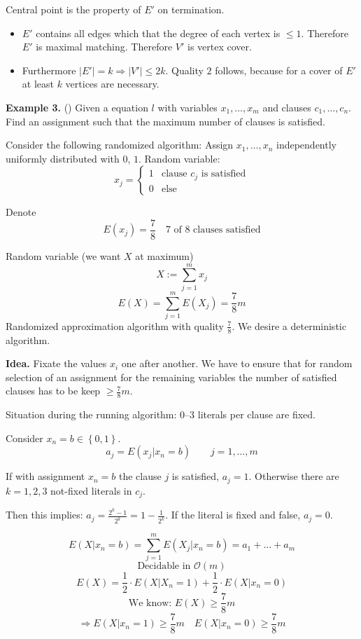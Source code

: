 \documentclass[a4paper]{article}
\newcommand{\probl}[1]{\text{\textsc{#1}}}
\newcommand{\set}[1]{\left\{#1\right\}}
\begin{document}
Central point is the property of $E'$ on termination.
\begin{itemize}
  \item
    $E'$ contains all edges which that the degree of each vertex
    is $\leq 1$. Therefore $E'$ is maximal matching.
    Therefore $V'$ is vertex cover.

  \item
    Furthermore $|E'| = k \Rightarrow |V'| \leq 2k$. Quality $2$ follows,
    because for a cover of $E'$ at least $k$ vertices are necessary.
\end{itemize}

\textbf{Example 3.} (\probl{Max-3-SAT}) Given a \probl{3~SAT} equation $l$ with variables
  $x_1, \ldots, x_m$ and clauses $c_1, \ldots, c_n$. Find an assignment such
  that the maximum number of clauses is satisfied.

Consider the following randomized algorithm:
Assign $x_1, \ldots, x_n$ independently uniformly distributed with $0$, $1$.
Random variable:
\[
  x_j = \begin{cases}
    1 & \text{clause } c_j \text{ is satisfied} \\
    0 & \text{else}
  \end{cases}
\]

Denote
\[
  E(x_j) = \frac78 \quad \text{7 of 8 clauses satisfied}
\]

Random variable (we want $X$ at maximum)
\[
  X := \sum_{j=1}^m x_j
\] \[
  E(X) = \sum_{j=1}^m E(X_j) = \frac78m
\]
Randomized approximation algorithm with quality $\frac78$.
We desire a deterministic algorithm.

\textbf{Idea.} Fixate the values $x_i$ one after another.
  We have to ensure that for random selection of an assignment
  for the remaining variables the number of satisfied clauses
  has to be keep $\geq \frac78m$.

Situation during the running algorithm:
  0--3 literals per clause are fixed.

Consider $x_n = b \in \set{0,1}$.
\[
  a_j = E(x_j | x_n = b) \qquad j = 1,\ldots,m
\]

If with assignment $x_n = b$ the clause $j$ is satisfied, $a_j = 1$.
Otherwise there are $k=1,2,3$ not-fixed literals in $c_j$.

Then this implies: $a_j = \frac{2^k - 1}{2^k} = 1 - \frac{1}{2^k}$.
If the literal is fixed and false, $a_j = 0$.


\[
  E(X|x_n = b) = \sum_{j=1}^m E(X_j | x_n = b) = a_1 + \ldots + a_m
\] \[
  \text{Decidable in } \mathcal{O}(m)
\] \[
  E(X) = \frac12 \cdot E(X | X_n = 1) + \frac12 \cdot E(X | x_n = 0)
\] \[
  \text{We know: } E(X) \geq \frac78 m
\] \[
  \Rightarrow
    E(X | x_n = 1) \geq \frac78 m  \quad
    E(X | x_n = 0) \geq \frac78 m
\]
\end{document}
